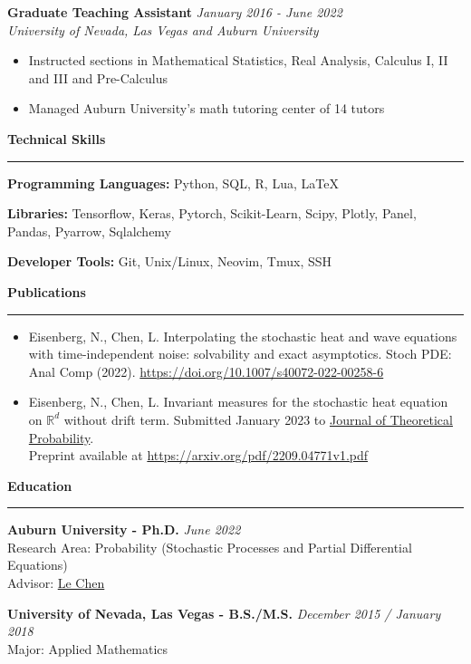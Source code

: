 \documentclass[11pt]{article}
\begin{document}
\textbf{\large Graduate Teaching Assistant}  \hfill \textit{January 2016 - June 2022} \\
\textit{University of Nevada, Las Vegas and Auburn University}
\begin{itemize} \setlength\itemsep{-0.5em}
  \item  Instructed sections in Mathematical Statistics, Real Analysis, Calculus I, II and III and Pre-Calculus
  \item Managed Auburn University's math tutoring center of 14 tutors
\end{itemize}

\vspace{.3em}
\textbf{\Large Technical Skills}
\vspace{.3em}
\hrule
\vspace{.3em}

\textbf{Programming Languages:}
Python, SQL, R, Lua, \LaTeX

\textbf{Libraries:} Tensorflow, Keras, Pytorch, Scikit-Learn, Scipy, Plotly, Panel, 
Pandas, Pyarrow, Sqlalchemy 

\textbf{Developer Tools:} Git, Unix/Linux, Neovim, Tmux, SSH

\vspace{.3em}
\textbf{\Large Publications}
\vspace{.3em}
\hrule
\vspace{.3em}

\begin{itemize}[leftmargin=*]
  \item[1:] Eisenberg, N., Chen, L. Interpolating the stochastic heat and wave equations with
  time-independent noise: solvability and exact asymptotics. Stoch PDE: Anal Comp (2022).
  \href{https://doi.org/10.1007/s40072-022-00258-6}{https://doi.org/10.1007/s40072-022-00258-6}

  \item[2:] Eisenberg, N., Chen, L. Invariant measures for the stochastic heat equation
  on $\mathbb{R}^d$ without drift term.
  Submitted January 2023 to
  \href{https://www.springer.com/journal/10959}{Journal of Theoretical Probability}. \\
  Preprint available at \href{https://arxiv.org/pdf/2209.04771v1.pdf}{https://arxiv.org/pdf/2209.04771v1.pdf} 
\end{itemize}

\vspace{.3em}
\textbf{\Large Education}
\vspace{.3em}
\hrule
\vspace{.3em}


\textbf{Auburn University - Ph.D.} \hfill \textit{June 2022} \\
Research Area: Probability (Stochastic Processes and Partial Differential Equations) \\
Advisor: \href{http://webhome.auburn.edu/~lzc0090/}{Le Chen}

\textbf{University of Nevada, Las Vegas - B.S./M.S.} \hfill \textit{December 2015 / January 2018} \\
Major: Applied Mathematics \\
\end{document}
